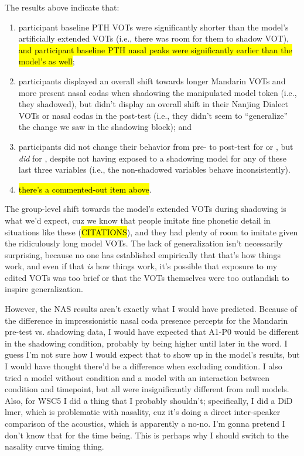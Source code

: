 The results above indicate that:
\begin{enumerate}
    \item participant baseline PTH VOTs were significantly shorter than the model's artificially extended VOTs (i.e., there was room for them to shadow VOT), \hl{and participant baseline PTH nasal peaks were significantly earlier than the model's as well};
    \item participants displayed an overall shift towards longer Mandarin VOTs and more present nasal codas when shadowing the manipulated model token (i.e., they shadowed), but didn't display an overall shift in their Nanjing Dialect VOTs or nasal codas in the post-test (i.e., they didn't seem to ``generalize'' the change we saw in the shadowing block); and
    \item participants did not change their behavior from pre- to post-test for \textipa{[e]/[iE]} or \textipa{[I]/[y]}, but \textit{did} for \textipa{[l]/[n]}, despite not having exposed to a shadowing model for any of these last three variables (i.e., the non-shadowed variables behave inconsistently).
    \item \hl{there's a commented-out item above}.
\end{enumerate}
The group-level shift towards the model's extended VOTs during shadowing is what we'd expect, cuz we know that people imitate fine phonetic detail in situations like these (\hl{CITATIONS}), and they had plenty of room to imitate given the ridiculously long model VOTs. The lack of generalization isn't necessarily surprising, because no one has established empirically that that's how things work, and even if that \textit{is} how things work, it's possible that exposure to my edited VOTs was too brief or that the VOTs themselves were too outlandish to inspire generalization.

However, the NAS results aren't exactly what I would have predicted. Because of the difference in impressionistic nasal coda presence percepts for the Mandarin pre-test vs. shadowing data, I would have expected that A1-P0 would be different in the shadowing condition, probably by being higher until later in the word. I guess I'm not sure how I would expect that to show up in the model's results, but I would have thought there'd be a difference when excluding condition. I also tried a model without condition and a model with an interaction between condition and timepoint, but all were insignificantly different from null models. Also, for WSC5 I did a thing that I probably shouldn't; specifically, I did a DiD lmer, which is problematic with nasality, cuz it's doing a direct inter-speaker comparison of the acoustics, which is apparently a no-no. I'm gonna pretend I don't know that for the time being. This is perhaps why I should switch to the nasality curve timing thing. 

